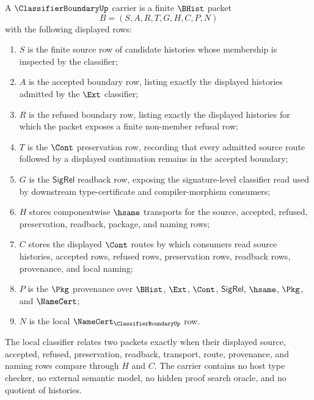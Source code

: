 \begin{definition}
\label{def:classifier-boundary-carrier}
A $\ClassifierBoundaryUp$ carrier is a finite $\BHist$ packet
$$
B=(S,A,R,T,G,H,C,P,N)
$$
with the following displayed rows:
\begin{enumerate}
\item $S$ is the finite source row of candidate histories whose membership is inspected by the classifier;
\item $A$ is the accepted boundary row, listing exactly the displayed histories admitted by the $\Ext$ classifier;
\item $R$ is the refused boundary row, listing exactly the displayed histories for which the packet exposes a finite non-member refusal row;
\item $T$ is the $\Cont$ preservation row, recording that every admitted source route followed by a displayed continuation remains in the accepted boundary;
\item $G$ is the $\mathsf{SigRel}$ readback row, exposing the signature-level classifier read used by downstream type-certificate and compiler-morphism consumers;
\item $H$ stores componentwise $\hsame$ transports for the source, accepted, refused, preservation, readback, package, and naming rows;
\item $C$ stores the displayed $\Cont$ routes by which consumers read source histories, accepted rows, refused rows, preservation rows, readback rows, provenance, and local naming;
\item $P$ is the $\Pkg$ provenance over $\BHist$, $\Ext$, $\Cont$, $\mathsf{SigRel}$, $\hsame$, $\Pkg$, and $\NameCert$;
\item $N$ is the local $\NameCert_{\ClassifierBoundaryUp}$ row.
\end{enumerate}
The local classifier relates two packets exactly when their displayed source, accepted, refused, preservation, readback, transport, route, provenance, and naming rows compare through $H$ and $C$. The carrier contains no host type checker, no external semantic model, no hidden proof search oracle, and no quotient of histories.
\end{definition}

